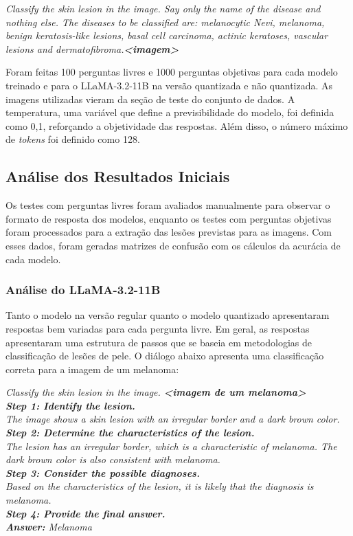 \begin{dialogue}
     \textit{Classify the skin lesion in the image. Say only the name of the disease and nothing else.
    The diseases to
    be classified are: melanocytic Nevi,
    melanoma, benign keratosis-like lesions, basal cell carcinoma, actinic keratoses, vascular lesions and
    dermatofibroma.\textbf{<imagem>}}
\end{dialogue}

Foram feitas 100 perguntas livres e 1000 perguntas objetivas para cada modelo treinado e para o \ac{LLaMA}-3.2-11B na
versão quantizada e não quantizada. As imagens utilizadas vieram da seção de teste do conjunto de dados. A
temperatura, uma variável que define a previsibilidade do modelo, foi definida como 0,1, reforçando a objetividade das
respostas. Além disso, o número máximo de \textit{tokens} foi definido como 128.

\subsection{Análise dos Resultados Iniciais}

Os testes com perguntas livres foram avaliados manualmente para observar o formato de resposta dos modelos, enquanto os
testes com perguntas objetivas foram processados para a extração das lesões previstas para as imagens. Com esses dados,
foram geradas matrizes de confusão com os cálculos da acurácia de cada modelo.

\subsubsection{Análise do LLaMA-3.2-11B}

Tanto o modelo na versão regular quanto o modelo quantizado apresentaram respostas bem variadas para cada pergunta
livre. Em geral, as respostas apresentaram uma estrutura de passos que se baseia em metodologias de classificação de
lesões de pele. O diálogo abaixo apresenta uma classificação correta para a imagem de um melanoma:

\begin{dialogue}
     \textit{Classify the skin lesion in the image. \textbf{<imagem de um melanoma>}} \\
     \textit{\textbf{Step 1: Identify the lesion.} \\
    The image shows a skin lesion with an irregular border and a dark brown color. \\
    \textbf{Step 2: Determine the characteristics of the lesion.} \\
    The lesion has an irregular border, which is a characteristic of melanoma. The dark brown color is also consistent
    with
    melanoma. \\
    \textbf{Step 3: Consider the possible diagnoses.} \\
    Based on the characteristics of the lesion, it is likely that the diagnosis is melanoma. \\
    \textbf{Step 4: Provide the final answer.} \\
    \textbf{Answer:} Melanoma}
\end{dialogue}

